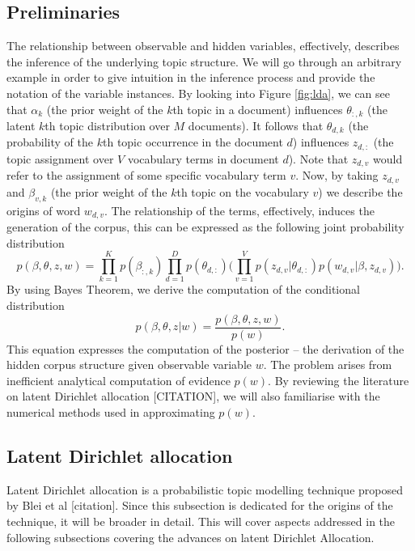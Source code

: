 \documentclass{mprop}
\begin{document}
\subsection{Preliminaries}
\par The relationship between observable and hidden variables, effectively, describes the inference of the underlying topic structure. We will go through an arbitrary example in order to give intuition in the inference process and provide the notation of the variable instances. By looking into Figure \ref{fig:lda}, we can see that $\alpha_k$ (the prior weight of the $k$th topic in a document) influences $\theta_{:, k}$ (the latent $k$th topic distribution over $M$ documents). It follows that $\theta_{d, k}$ (the probability of the $k$th topic occurrence in the document $d$) influences $z_{d, :}$ (the topic assignment over $V$ vocabulary terms in document $d$). Note that $z_{d, v}$ would refer to the assignment of some specific vocabulary term $v$. Now, by taking $z_{d, v}$ and $\beta_{v, k}$ (the prior weight of the $k$th topic on the vocabulary $v$) we describe the origins of word $w_{d, v}$. The relationship of the terms, effectively, induces the generation of the corpus, this can be expressed as the following joint probability distribution
\begin{equation}
p(\beta, \theta, z, w) = \prod_{k=1}^Kp(\beta_{:, k})\prod_{d=1}^Dp(\theta_{d, :})\bigg(\prod_{v=1}^Vp(z_{d, v} | \theta_{d, :})p(w_{d, v} | \beta, z_{d, v})\bigg).
\end{equation}
By using Bayes Theorem, we derive the computation of the conditional distribution
\begin{equation}
p(\beta, \theta, z | w) = \frac{p(\beta, \theta, z, w)}{p(w)}. 
\end{equation}
This equation expresses the computation of the posterior -- the derivation of the hidden corpus structure given observable variable $w$. The problem arises from inefficient analytical computation of evidence $p(w)$. By reviewing the literature on latent Dirichlet allocation [CITATION], we will also familiarise with the numerical methods used in approximating $p(w)$.

\subsection{Latent Dirichlet allocation}

\par Latent Dirichlet allocation is a probabilistic topic modelling technique  proposed by Blei et al [citation]. Since this subsection is dedicated for the origins of the technique, it will be broader in detail. This will cover aspects addressed in the following subsections covering the advances on latent Dirichlet Allocation. 
\end{document}
